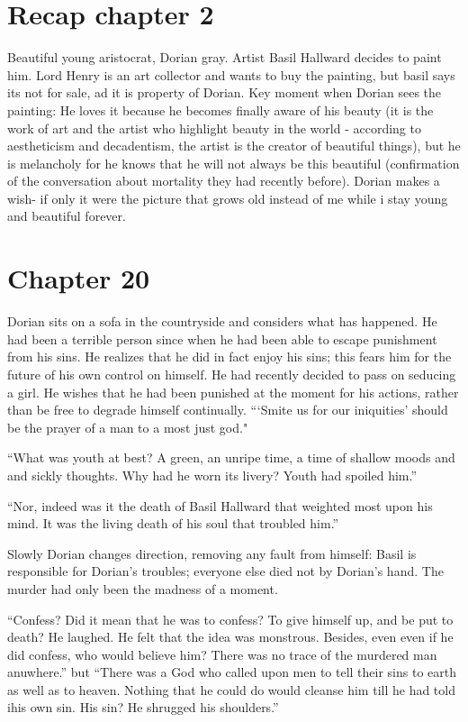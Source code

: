 \documentclass{article}
\title{\jobname}
\author{Eugenio Animali}
\begin{document}
\maketitle

\section*{Recap chapter 2}
Beautiful young aristocrat, Dorian gray. Artist Basil Hallward decides to paint him. Lord Henry is an art collector and wants to buy the painting, but basil says its not for sale, ad it is property of Dorian. Key moment when Dorian sees the painting: He loves it because he becomes finally aware of his beauty (it is the work of art and the artist who highlight beauty in the world - according to aestheticism and decadentism, the artist is the creator of beautiful things), but he is melancholy for he knows that he will not always be this beautiful (confirmation of the conversation about mortality they had recently before). Dorian makes a wish- if only it were the picture that grows old instead of me while i stay young and beautiful forever.
\section*{Chapter 20}
Dorian sits on a sofa in the countryside and considers what has happened. He had been a terrible person since when he had been able to escape punishment from his sins. He realizes that he did in fact enjoy his sins; this fears him for the future of his own control on himself. He had recently decided to pass on seducing a girl. He wishes that he had been punished at the moment for his actions, rather than be free to degrade himself continually. ```Smite us for our iniquities' should be the prayer of a man to a most just god."

``What was youth at best? A green, an unripe time, a time of shallow moods and and sickly thoughts. Why had he worn its livery? Youth had spoiled him.''

``Nor, indeed was it the death of Basil Hallward that weighted most upon his mind. It was the living death of his soul that troubled him.''

Slowly Dorian changes direction, removing any fault from himself: Basil is responsible for Dorian's troubles; everyone else died not by Dorian's hand. The murder had only been the madness of a moment.

``Confess? Did it mean that he was to confess? To give himself up, and be put to death? He laughed. He felt that the idea was monstrous. Besides, even even if he did confess, who would believe him? There was no trace of the murdered man anuwhere.'' but ``There was a God who called upon men to tell their sins to earth as well as to heaven. Nothing that he could do would cleanse him till he had told ihis own sin. His sin? He shrugged his shoulders.''
\end{document}
